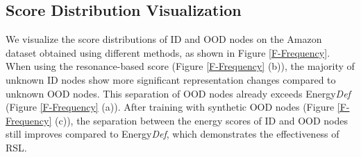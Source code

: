 \subsection{Score Distribution Visualization}\label{subsec-visualization}

We visualize the score distributions of ID and OOD nodes on the Amazon dataset obtained using different methods, as shown in Figure \ref{F-Frequency}. When using the resonance-based score (Figure  \ref{F-Frequency} (b)), the majority of unknown ID nodes show more significant representation changes compared to 
 unknown OOD nodes. This separation of OOD nodes already exceeds Energy\textit{Def} (Figure  \ref{F-Frequency} (a)). After training with synthetic OOD nodes (Figure \ref{F-Frequency} (c)), the separation between the energy scores of ID and OOD nodes still improves compared to Energy\textit{Def}, which demonstrates the effectiveness of RSL.